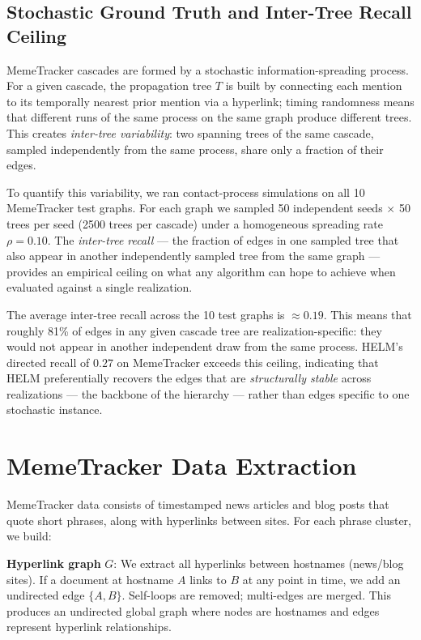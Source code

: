 \documentclass{article}
\begin{document}
    \subsection{Stochastic Ground Truth and Inter-Tree Recall Ceiling}
    \label{app:inter-tree}

    MemeTracker cascades are formed by a stochastic information-spreading process. For a given cascade, the propagation tree $T$ is built by connecting each mention to its temporally nearest prior mention via a hyperlink; timing randomness means that different runs of the same process on the same graph produce different trees. This creates \emph{inter-tree variability}: two spanning trees of the same cascade, sampled independently from the same process, share only a fraction of their edges.

    To quantify this variability, we ran contact-process simulations on all 10 MemeTracker test graphs. For each graph we sampled 50 independent seeds $\times$ 50 trees per seed (2500 trees per cascade) under a homogeneous spreading rate $\rho = 0.10$. The \emph{inter-tree recall} — the fraction of edges in one sampled tree that also appear in another independently sampled tree from the same graph — provides an empirical ceiling on what any algorithm can hope to achieve when evaluated against a single realization.

    The average inter-tree recall across the 10 test graphs is $\approx 0.19$. This means that roughly 81\% of edges in any given cascade tree are realization-specific: they would not appear in another independent draw from the same process. HELM's directed recall of $0.27$ on MemeTracker exceeds this ceiling, indicating that HELM preferentially recovers the edges that are \emph{structurally stable} across realizations — the backbone of the hierarchy — rather than edges specific to one stochastic instance.

    \section{MemeTracker Data Extraction}
    \label{app:memetracker}

    MemeTracker data consists of timestamped news articles and blog posts that quote short phrases, along with hyperlinks between sites. For each phrase cluster, we build:

    \textbf{Hyperlink graph} $G$: We extract all hyperlinks between hostnames (news/blog sites). If a document at hostname $A$ links to $B$ at any point in time, we add an undirected edge $\{A, B\}$. Self-loops are removed; multi-edges are merged. This produces an undirected global graph where nodes are hostnames and edges represent hyperlink relationships.
\end{document}
